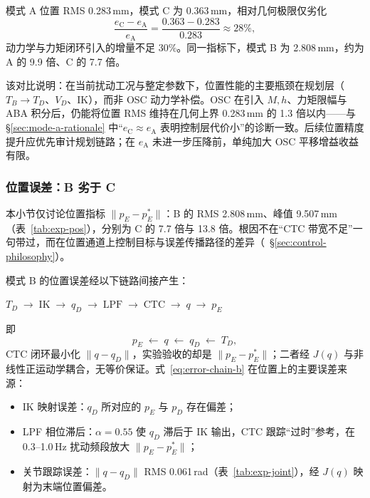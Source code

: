 \documentclass[UTF8, a4paper, 12pt]{ctexart}
\begin{document}
模式 A 位置 RMS 0.283\,mm，模式 C 为 0.363\,mm，相对几何极限仅劣化
\begin{equation}
    \frac{e_{\mathrm{C}}-e_{\mathrm{A}}}{e_{\mathrm{A}}}
    = \frac{0.363-0.283}{0.283} \approx 28\%,
\end{equation}
动力学与力矩闭环引入的增量不足 30\%。同一指标下，模式 B 为 2.808\,mm，约为 A 的 9.9 倍、C 的 7.7 倍。

该对比说明：在当前扰动工况与整定参数下，位置性能的主要瓶颈在规划层（$T_B\!\rightarrow\! T_D$、$V_D$、IK），而非 OSC 动力学补偿。OSC 在引入 $M,h$、力矩限幅与 ABA 积分后，仍能将位置 RMS 维持在几何上界 0.283\,mm 的 1.3 倍以内——与 §\ref{sec:mode-a-rationale} 中``$e_{\mathrm{C}}\approx e_{\mathrm{A}}$ 表明控制层代价小''的诊断一致。后续位置精度提升应优先审计规划链路；在 $e_{\mathrm{A}}$ 未进一步压降前，单纯加大 OSC 平移增益收益有限。

\subsubsection{位置误差：B 劣于 C}
\label{sec:result-pos-bc}

本小节仅讨论位置指标 $\|p_E-p_E^*\|$：B 的 RMS 2.808\,mm、峰值 9.507\,mm（表~\ref{tab:exp-pos}），分别为 C 的 7.7 倍与 13.8 倍。根因不在``CTC 带宽不足''一句带过，而在位置通道上控制目标与误差传播路径的差异（~\S\ref{sec:control-philosophy}）。

模式 B 的位置误差经以下链路间接产生：
\begin{center}
$T_D \;\rightarrow\; \mathrm{IK} \;\rightarrow\; q_D \;\rightarrow\; \mathrm{LPF} \;\rightarrow\; \mathrm{CTC} \;\rightarrow\; q \;\rightarrow\; p_E$
\end{center}
即
\begin{equation}
    p_E \;\leftarrow\; q \;\leftarrow\; q_D \;\leftarrow\; T_D,
    \label{eq:error-chain-b}
\end{equation}
CTC 闭环最小化 $\|q-q_D\|$，实验验收的却是 $\|p_E-p_E^*\|$；二者经 $J(q)$ 与非线性正运动学耦合，无等价保证。式~\eqref{eq:error-chain-b} 在位置上的主要误差来源：
\begin{itemize}[leftmargin=2em]
    \item IK 映射误差：$q_D$ 所对应的 $p_E$ 与 $p_D$ 存在偏差；
    \item LPF 相位滞后：$\alpha=0.55$ 使 $q_D$ 滞后于 IK 输出，CTC 跟踪``过时''参考，在 0.3--1.0\,Hz 扰动频段放大 $\|p_E-p_E^*\|$；
    \item 关节跟踪误差：$\|q-q_D\|$ RMS 0.061\,rad（表~\ref{tab:exp-joint}），经 $J(q)$ 映射为末端位置偏差。
\end{itemize}
\end{document}
